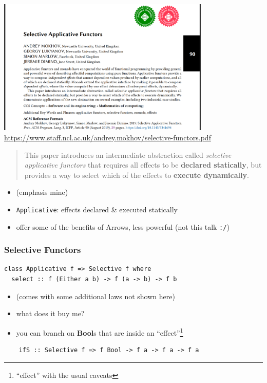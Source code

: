 \documentclass[aspectratio=169]{beamer}
\begin{document}
\begin{frame}[fragile]
  \begin{center}
    \includegraphics[width=0.76\textwidth]{static-images/selective-applicative-functors-paper.jpg}
    \vfill
    \href{https://www.staff.ncl.ac.uk/andrey.mokhov/selective-functors.pdf}{https://www.staff.ncl.ac.uk/andrey.mokhov/selective-functors.pdf}
  \end{center}
\end{frame}

\begin{frame}
    \begin{quote}
    This paper introduces an intermediate abstraction called
    \textit{selective applicative functors} that requires all effects
    to be \textbf{declared statically}, but provides a way to select which of
    the effects to \textbf{execute dynamically}.
  \end{quote}

  \begin{itemize}
  \item (emphasis mine)
  \item \texttt{Applicative}: effects declared \& executed statically
  \item offer some of the benefits of Arrows, less powerful (not this talk \texttt{:/})
  \end{itemize}
\end{frame}

\begin{frame}[fragile]
  \frametitle{Selective Functors}
  \begin{verbatim}
class Applicative f => Selective f where
  select :: f (Either a b) -> f (a -> b) -> f b
  \end{verbatim}
  \vspace{5mm}
  \begin{itemize}
  \item (comes with some additional laws not shown here)
  \item what does it buy me?
  \item you can branch on \textbf{Bool}s that are inside an ``effect''\footnote{``effect'' with the usual caveats}
  \end{itemize}
  \begin{verbatim}
    ifS :: Selective f => f Bool -> f a -> f a -> f a
  \end{verbatim}
\end{frame}
\end{document}
